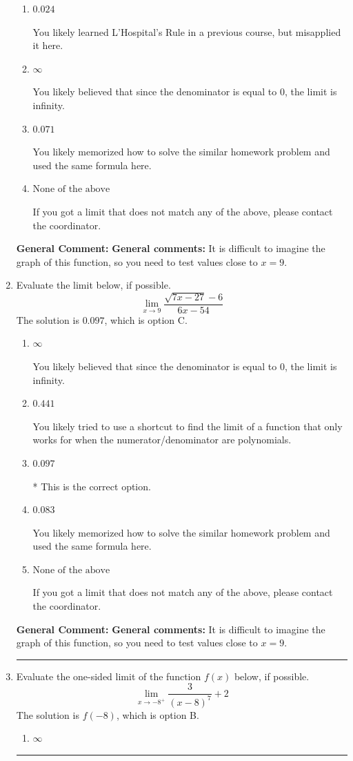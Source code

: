 \documentclass{extbook}[14pt]
\newcommand{\litem}[1]{\item #1

\rule{\textwidth}{0.4pt}}
\begin{document}
\begin{enumerate}
{\begin{enumerate}[label=\Alph*.]
* This is the correct option.
\item \( 0.024 \)

You likely learned L'Hospital's Rule in a previous course, but misapplied it here.
\item \( \infty \)

You likely believed that since the denominator is equal to 0, the limit is infinity.
\item \( 0.071 \)

You likely memorized how to solve the similar homework problem and used the same formula here.
\item \( \text{None of the above} \)

If you got a limit that does not match any of the above, please contact the coordinator.
\end{enumerate}

\textbf{General Comment:} \textbf{General comments:} It is difficult to imagine the graph of this function, so you need to test values close to $x = 9$.
}
\litem{
Evaluate the limit below, if possible.
\[ \lim_{x \rightarrow 9} \frac{\sqrt{7x - 27} - 6}{6x - 54} \]The solution is \( 0.097 \), which is option C.\begin{enumerate}[label=\Alph*.]
\item \( \infty \)

You likely believed that since the denominator is equal to 0, the limit is infinity.
\item \( 0.441 \)

You likely tried to use a shortcut to find the limit of a function that only works for when the numerator/denominator are polynomials.
\item \( 0.097 \)

* This is the correct option.
\item \( 0.083 \)

You likely memorized how to solve the similar homework problem and used the same formula here.
\item \( \text{None of the above} \)

If you got a limit that does not match any of the above, please contact the coordinator.
\end{enumerate}

\textbf{General Comment:} \textbf{General comments:} It is difficult to imagine the graph of this function, so you need to test values close to $x = 9$.
}
\litem{
Evaluate the one-sided limit of the function $f(x)$ below, if possible.
\[ \lim_{x \rightarrow -8^+} \frac{3}{(x-8)^7}+2 \]The solution is \( f(-8) \), which is option B.\begin{enumerate}[label=\Alph*.]
\item \( \infty \)



\end{enumerate}}
\end{enumerate}
\end{document}
